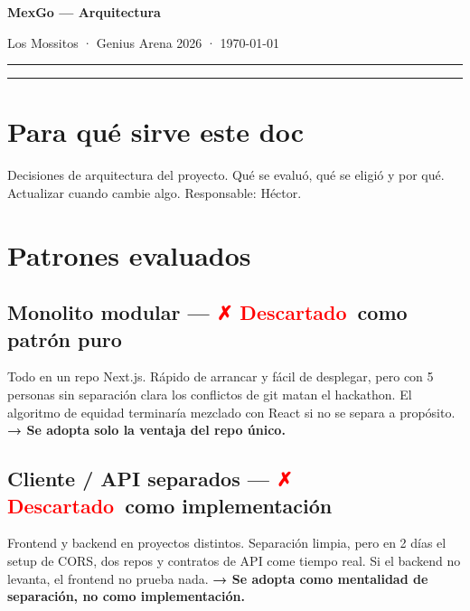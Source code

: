 \documentclass[11pt,a4paper]{article}
\newcommand{\dec}[1]{\textcolor{a}{\textbf{→ #1}}}
\newcommand{\descartado}{\textcolor{red}{\textbf{✗ Descartado}}}
\begin{document}

{\centering
  {\Large\bfseries\color{d} MexGo — Arquitectura}\par
  \vspace{0.3cm}
  {\small\color{g} Los Mossitos · Genius Arena 2026 · \today}\par
  \vspace{0.5cm}
  \hrule
  \vspace{0.8cm}
}

\tableofcontents
\vspace{1cm}
\hrule
\vspace{0.5cm}

\section{Para qué sirve este doc}

Decisiones de arquitectura del proyecto. Qué se evaluó, qué se eligió y por
qué. Actualizar cuando cambie algo. Responsable: Héctor.

\section{Patrones evaluados}

\subsection{Monolito modular — \descartado\ como patrón puro}

Todo en un repo Next.js. Rápido de arrancar y fácil de desplegar, pero con
5 personas sin separación clara los conflictos de git matan el hackathon.
El algoritmo de equidad terminaría mezclado con React si no se separa a
propósito. \dec{Se adopta solo la ventaja del repo único.}

\subsection{Cliente / API separados — \descartado\ como implementación}

Frontend y backend en proyectos distintos. Separación limpia, pero en 2 días
el setup de CORS, dos repos y contratos de API come tiempo real. Si el backend
no levanta, el frontend no prueba nada. \dec{Se adopta como mentalidad
de separación, no como implementación.}
\end{document}
